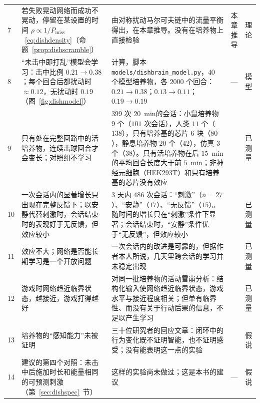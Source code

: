 {\begin{longtable}{>{\raggedright}p{0.5cm}>{\raggedright}p{4.0cm}>{\raggedright}p{5.6cm}>{\raggedright}p{2.3cm}>{\raggedright\arraybackslash}p{1.7cm}}
7 & 若失败晃动网络而成功不晃动，停留在某设置的时间 $\rho\propto1/P_{\text{miss}}$~\eqref{eq:dishdensity}（命题~\ref{prop:dishscramble}） & 由对称扰动马尔可夫链中的流量平衡得出，在本章推导。没有在培养物上直接检验 & 本章推导 & 理论 \\
8 & “未击中即打乱”模型会学习：击中比例 $0.21\to0.38$；每个回合后都扰动时 $\approx0.12$，无扰动时 $0.19$（图~\ref{fig:dishmodel}） & 计算，脚本 \texttt{models/dishbrain\_model.py}，$40$ 个模型培养物，各 $2000$ 个回合：$0.21\to0.38$；$0.13\to0.11$；$0.19\to0.19$ & --- & 模型 \\
9 & 只有处在完整回路中的活培养物，连续击球回合才会变长；对照组不学习 & $399$ 次 $20$~min的会话：小鼠培养物 $9$ 个（$101$ 次会话），人类 $11$ 个（$138$），只有培养基的芯片 $6$ 块（$80$），静息培养物 $20$ 个（$42$），仿真 $3$ 个（$38$）。只有活培养物在后 $15$~min的平均回合长度大于前 $5$~min；非神经元细胞（HEK293T）和只有培养基的芯片没有效应 & \cite{Kagan2022} & 已测量 \\
10 & 一次会话内的显著增长只出现在完整反馈下；以安静代替刺激时，会话结束时的表现好于无反馈，但效应较小 & $3$ 天内 $486$ 次会话：“刺激”（$n=27$）、“安静”（$17$）、“无反馈”（$15$）。随时间的增长只在“刺激”条件下显著；会话结束时，“安静”条件优于“无反馈”，但效应较小 & \cite{Kagan2022} & 已测量 \\
11 & 效应不大；网络是否能长期学习是一个开放问题 & 一次会话内的改进是可靠的，但据作者本人所说，几天里跨会话的学习并未稳定出现 & \cite{Kagan2022} & 已测量 \\
12 & 游戏时网络趋近临界状态，越接近，游戏打得越好 & 对同一批培养物的活动雪崩分析：结构化输入使网络趋近临界状态，游戏水平与接近程度相关；但单有临界性、而没有关于行动后果的信息，不足以产生学习 & \cite{Habibollahi2023} & 已测量 \\
13 & 培养物的“感知能力”未被证明 & 三十位研究者的回应文章：闭环中的行为变化既不证明智能，也不证明感受；没有能表明这一点的实验 & \cite{Balci2023} & 假说 \\
14 & 建议的第四个对照：未击中后施加时长和能量相同的可预测刺激（第~\ref{sec:dishspec}~节） & 这样的实验尚未做过；这是本书的建议 & --- & 假说 \\
\bottomrule
\end{longtable}}
